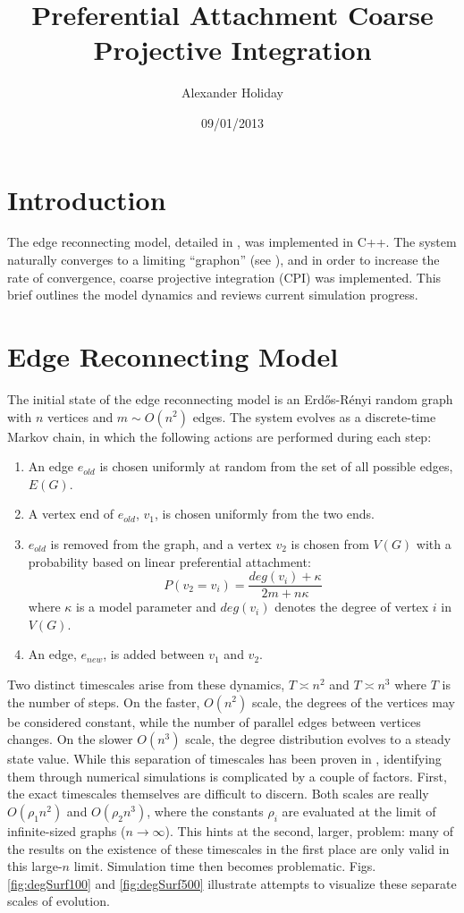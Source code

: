 \documentclass[11pt]{article}
\begin{document}
\title{Preferential Attachment Coarse Projective Integration}
\author{Alexander Holiday\vspace{-2ex}}
\date{09/01/2013}
\maketitle
\section*{Introduction}
The edge reconnecting model, detailed in \cite{balasz:rsa12}, was implemented in C++. The system naturally converges to a limiting ``graphon'' (see \cite{lovasz:jcombth06}), and in order to increase the rate of convergence, coarse projective integration (CPI) was implemented. This brief outlines the model dynamics and reviews current simulation progress.

\section*{Edge Reconnecting Model}
The initial state of the edge reconnecting model is an Erd\H{o}s-R\'{e}nyi random graph with $n$ vertices and $m\sim O(n^{2})$ edges. The system evolves as a discrete-time Markov chain, in which the following actions are performed during each step:

\begin{enumerate}
\item An edge $e_{old}$ is chosen uniformly at random from the set of all possible edges, $E(G)$.
\item A vertex end of $e_{old}$, $v_{1}$, is chosen uniformly from the two ends.
\item $e_{old}$ is removed from the graph, and a vertex $v_{2}$ is chosen from $V(G)$ with a probability based on linear preferential attachment:
  \[
  P(v_{2}=v_{i})=\frac{deg(v_{i})+\kappa}{2m+n\kappa}
  \]
where $\kappa$ is a model parameter and $deg(v_{i})$ denotes the degree of vertex $i$ in $V(G)$.
\item An edge, $e_{new}$, is added between $v_{1}$ and $v_{2}$.
\end{enumerate}

Two distinct timescales arise from these dynamics, $T\asymp n^{2}$ and $T\asymp n^{3}$ where $T$ is the number of steps. On the faster, $O(n^{2})$ scale, the degrees of the vertices may be considered constant, while the number of parallel edges between vertices changes. On the slower $O(n^{3})$ scale, the degree distribution evolves to a steady state value. While this separation of timescales has been proven in \cite{balasz:rsa12}, identifying them through numerical simulations is complicated by a couple of factors. First, the exact timescales themselves are difficult to discern. Both scales are really $O(\rho_{1} n^{2})$ and $O(\rho_{2} n^{3})$, where the constants $\rho_{i}$ are evaluated at the limit of infinite-sized graphs ($n\rightarrow \infty$). This hints at the second, larger, problem: many of the results on the existence of these timescales in the first place are only valid in this large-$n$ limit. Simulation time then becomes problematic. Figs. \ref{fig:degSurf100} and \ref{fig:degSurf500} illustrate attempts to visualize these separate scales of evolution.
\clearpage
\end{document}
